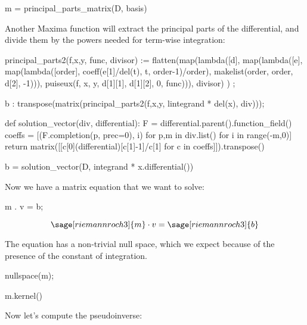 \begin{sageblock}[riemannroch3]
m = principal_parts_matrix(D, basis)
\end{sageblock}

Another Maxima function will extract the principal parts of the
differential, and divide them by the powers needed for term-wise
integration:

\begin{maximacommon}
principal_parts2(f,x,y, func, divisor) :=
  flatten(map(lambda([d],
    map(lambda([e],
      map(lambda([order], coeff(e[1]/del(t), t, order-1)/order),
          makelist(order, order, d[2], -1))),
       puiseux(f, x, y, d[1][1], d[1][2], 0, func))), divisor)
  )
;
\end{maximacommon}

\begin{maximablock}
b : transpose(matrix(principal_parts2(f,x,y, lintegrand * del(x), div)));
\end{maximablock}

\begin{sageblock}[riemannroch3]
def solution_vector(div, differential):
    F = differential.parent().function_field()
    coeffs = [(F.completion(p, prec=0), i) for p,m in div.list() for i in range(-m,0)]
    return matrix([[c[0](differential)[c[1]-1]/c[1] for c in coeffs]]).transpose()
\end{sageblock}

\begin{sageblock}[riemannroch3]
b = solution_vector(D, integrand * x.differential())
\end{sageblock}

Now we have a matrix equation that we want to solve:

\begin{maximablock}
m . v = b;
\end{maximablock}

$$\sage[riemannroch3]{m} \cdot v = \sage[riemannroch3]{b}$$

The equation has a non-trivial null space, which we expect because
of the presence of the constant of integration.

\begin{maximablock}
nullspace(m);
\end{maximablock}

\begin{sageblock}[riemannroch3]
m.kernel()
\end{sageblock}

Now let's compute the pseudoinverse:

